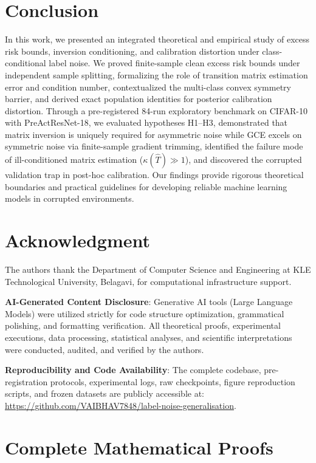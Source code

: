 \documentclass[journal]{IEEEtran}
\theoremstyle{definition}
\begin{document}
\section{Conclusion}
In this work, we presented an integrated theoretical and empirical study of excess risk bounds, inversion conditioning, and calibration distortion under class-conditional label noise. We proved finite-sample clean excess risk bounds under independent sample splitting, formalizing the role of transition matrix estimation error and condition number, contextualized the multi-class convex symmetry barrier, and derived exact population identities for posterior calibration distortion. Through a pre-registered 84-run exploratory benchmark on CIFAR-10 with PreActResNet-18, we evaluated hypotheses H1--H3, demonstrated that matrix inversion is uniquely required for asymmetric noise while GCE excels on symmetric noise via finite-sample gradient trimming, identified the failure mode of ill-conditioned matrix estimation ($\kappa(\hat{T}) \gg 1$), and discovered the corrupted validation trap in post-hoc calibration. Our findings provide rigorous theoretical boundaries and practical guidelines for developing reliable machine learning models in corrupted environments.

\section*{Acknowledgment}
The authors thank the Department of Computer Science and Engineering at KLE Technological University, Belagavi, for computational infrastructure support.

\textbf{AI-Generated Content Disclosure}: Generative AI tools (Large Language Models) were utilized strictly for code structure optimization, grammatical polishing, and formatting verification. All theoretical proofs, experimental executions, data processing, statistical analyses, and scientific interpretations were conducted, audited, and verified by the authors.

\textbf{Reproducibility and Code Availability}: The complete codebase, pre-registration protocols, experimental logs, raw checkpoints, figure reproduction scripts, and frozen datasets are publicly accessible at: \url{https://github.com/VAIBHAV7848/label-noise-generalisation}.




\appendices

\section{Complete Mathematical Proofs}
\end{document}
